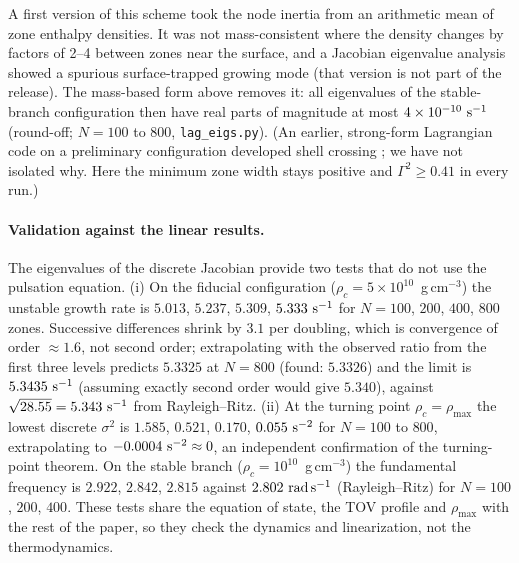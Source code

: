 \documentclass[11pt]{article}
\begin{document}
A first version of this scheme took the node inertia from an arithmetic mean of zone enthalpy densities. It was not mass-consistent where the density changes by factors of 2--4 between zones near the surface, and a Jacobian eigenvalue analysis showed a spurious surface-trapped growing mode (that version is not part of the release). The mass-based form above removes it: all eigenvalues of the stable-branch configuration then have real parts of magnitude at most $4\times10^{-10}\ {\rm s^{-1}}$ (round-off; $N=100$ to $800$, \texttt{lag\_eigs.py}). (An earlier, strong-form Lagrangian code on a preliminary configuration developed shell crossing \citep{OwnbyPhase2}; we have not isolated why. Here the minimum zone width stays positive and $\Gamma^2\ge0.41$ in every run.)

\paragraph{Validation against the linear results.} The eigenvalues of the discrete Jacobian provide two tests that do not use the pulsation equation. (i) On the fiducial configuration ($\rho_c=5\times10^{10}$~g\,cm$^{-3}$) the unstable growth rate is $5.013$, $5.237$, $5.309$, $5.333\ {\rm s^{-1}}$ for $N=100$, $200$, $400$, $800$ zones. Successive differences shrink by $3.1$ per doubling, which is convergence of order $\approx1.6$, not second order; extrapolating with the observed ratio from the first three levels predicts $5.3325$ at $N=800$ (found: $5.3326$) and the limit is $5.3435\ {\rm s^{-1}}$ (assuming exactly second order would give $5.340$), against $\sqrt{28.55}=5.343\ {\rm s^{-1}}$ from Rayleigh--Ritz. (ii) At the turning point $\rho_c=\rho_{\max}$ the lowest discrete $\sigma^2$ is $1.585$, $0.521$, $0.170$, $0.055\ {\rm s^{-2}}$ for $N=100$ to $800$, extrapolating to $-0.0004\ {\rm s^{-2}}\approx0$, an independent confirmation of the turning-point theorem. On the stable branch ($\rho_c=10^{10}$~g\,cm$^{-3}$) the fundamental frequency is $2.922$, $2.842$, $2.815$ against $2.802\ {\rm rad\,s^{-1}}$ (Rayleigh--Ritz) for $N=100$, $200$, $400$. These tests share the equation of state, the TOV profile and $\rho_{\max}$ with the rest of the paper, so they check the dynamics and linearization, not the thermodynamics.
\end{document}
